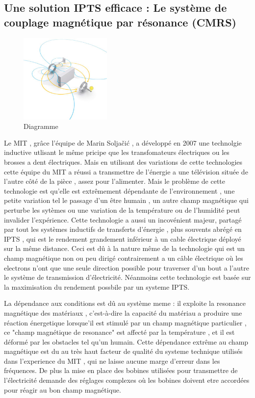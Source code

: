 \documentclass[12pt]{report}
\begin{document}
\subsection{Une solution IPTS efficace : Le système de couplage magnétique par résonance (CMRS) \cite{mSojal}}
\begin{figure}
  \begin{center}
  \includegraphics[width=0.4\textwidth]{WTdiagram}
  \end{center}
\caption{Diagramme}
\end{figure}Le MIT , grâce l'équipe de Marin Soljačić , a développé en 2007 une technolgie inductive utlisant le même pricipe que les transfomateurs électriques ou les brosses a dent électriques. Mais en utilisant des variations de cette technologies cette équipe du MIT a réussi a transmettre de l'énergie a une télévision située de l'autre côté de la pièce , assez pour l'alimenter. Mais le problème de cette technologie est qu'elle est extrêmement dépendante de l'environnement , une petite variation tel le passage d'un être humain , un autre champ magnétique qui perturbe les sytèmes ou une variation de la température ou de l'humidité peut invalider l'expérience. Cette technologie a aussi un incovénient majeur, partagé par tout les systèmes inductifs de transferts d'énergie , plus souvents abrégé en IPTS , qui est le rendement grandement inférieur à un cable électrique déployé sur la même distance. Ceci est dû à la nature même de la technologie qui est un champ magnétique non ou peu dirigé contrairement a un câble électrique où les electrons n'ont que une seule direction possible pour traverser d'un bout a l'autre le système de transmission d'électricité. Néanmoins cette technologie est basée sur la maximisation du rendement possbile par un systeme IPTS.

	La dépendance aux conditions est dû au système meme : il exploite la resonance magnétique des matériaux , c'est-à-dire la capacité du matériau a produire une réaction énergetique lorsque'il est stimulé par un champ magnétique particulier , ce "champ magnétique de resonance" est affecté par la température , et il est déformé par les obstacles tel qu'un humain. Cette dépendance extrême au champ magnétique est du au très haut facteur de qualité du systeme technique utilisés dans l'experience du MIT , qui ne laisse aucune marge d'erreur dans les fréquences. De plus la mise en place des bobines utilisées pour transmettre de l'électricité demande des réglages complexes où les bobines doivent etre accordées pour réagir au bon champ magnétique.
	
\end{document}

